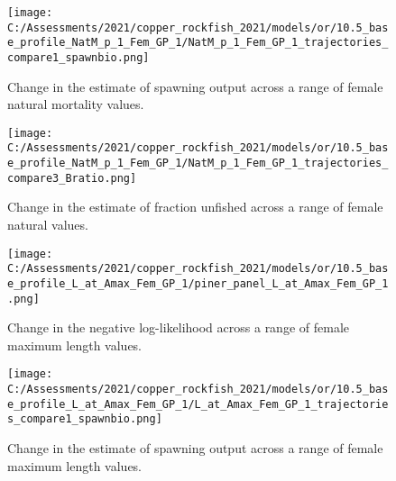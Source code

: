 \documentclass[11pt,
  english,
  a4paper,
]{article}
\begin{document}
\tagmcend\tagstructend


\begin{figure}
\centering
\texttt{[image: C:/Assessments/2021/copper\_rockfish\_2021/models/or/10.5\_base\_profile\_NatM\_p\_1\_Fem\_GP\_1/NatM\_p\_1\_Fem\_GP\_1\_trajectories\_compare1\_spawnbio.png]}
\caption{Change in the estimate of spawning output across a range of female natural mortality values.\label{fig:m-ssb}}
\end{figure}

\tagmcend\tagstructend


\begin{figure}
\centering
\texttt{[image: C:/Assessments/2021/copper\_rockfish\_2021/models/or/10.5\_base\_profile\_NatM\_p\_1\_Fem\_GP\_1/NatM\_p\_1\_Fem\_GP\_1\_trajectories\_compare3\_Bratio.png]}
\caption{Change in the estimate of fraction unfished across a range of female natural values.\label{fig:m-depl}}
\end{figure}

\tagmcend\tagstructend


\begin{figure}
\centering
\texttt{[image: C:/Assessments/2021/copper\_rockfish\_2021/models/or/10.5\_base\_profile\_L\_at\_Amax\_Fem\_GP\_1/piner\_panel\_L\_at\_Amax\_Fem\_GP\_1.png]}
\caption{Change in the negative log-likelihood across a range of female maximum length values.\label{fig:linf-profile}}
\end{figure}

\tagmcend\tagstructend


\begin{figure}
\centering
\texttt{[image: C:/Assessments/2021/copper\_rockfish\_2021/models/or/10.5\_base\_profile\_L\_at\_Amax\_Fem\_GP\_1/L\_at\_Amax\_Fem\_GP\_1\_trajectories\_compare1\_spawnbio.png]}
\caption{Change in the estimate of spawning output across a range of female maximum length values.\label{fig:linf-ssb}}
\end{figure}
\end{document}
